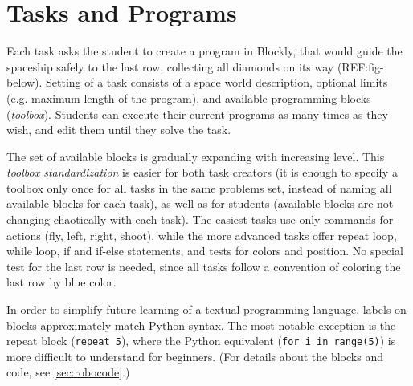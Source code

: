 



\section{Tasks and Programs}
\label{sec:robomission.programs}

Each task asks the student to create a program in Blockly,
that would guide the spaceship safely to the last row,
collecting all diamonds on its way (REF:fig-below).
Setting of a task consists of a space world description,
optional limits (e.g. maximum length of the program), %
and available programming blocks (\emph{toolbox}).
Students can execute their current programs as many times
as they wish, and edit them until they solve the task.

The set of available blocks is gradually expanding with
increasing level. This \emph{toolbox standardization}
is easier for both task creators (it is enough to specify
a toolbox only once for all tasks in the same problems set,
instead of naming all available blocks for each task),
as well as for  students
(available blocks are not changing chaotically with each task).
The easiest tasks use only commands for actions (fly, left, right, shoot),
while the more advanced tasks offer repeat loop, while loop, if and if-else statements,
and tests for colors and position.
No special test for the last row is needed, since all tasks follow a convention
of coloring the last row by blue color.

In order to simplify future learning of a textual programming language,
labels on blocks approximately match Python syntax. %
The most notable exception is the repeat block (\texttt{repeat 5}),
where the Python equivalent (\texttt{for i in range(5)}) is more difficult
to understand for beginners.
(For details about the blocks and code, see \cref{sec:robocode}.)

